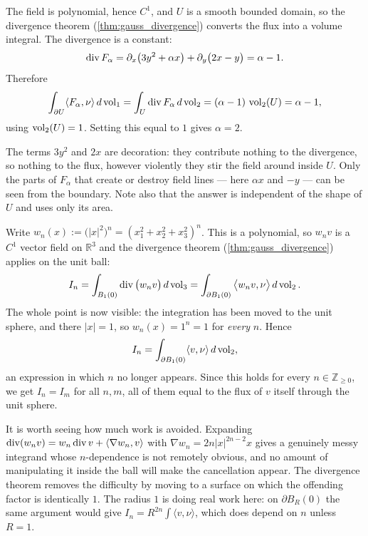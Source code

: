 \begin{exercisesolution}
\label{sol:tuning_alpha_prescribed_flux}
The field is polynomial, hence $C^1$, and $U$ is a smooth bounded domain, so the divergence theorem
(\cref{thm:gauss_divergence}) converts the flux into a volume integral. The divergence is a constant:
\[\operatorname{div} F_\alpha = \partial_x\big(3y^2 + \alpha x\big) + \partial_y\big(2x - y\big) = \alpha - 1 .\]
Therefore
\[\int_{\partial U} \langle F_\alpha, \nu\rangle \, d\operatorname{vol}_1 = \int_U \operatorname{div} F_\alpha \, d\operatorname{vol}_2
  = (\alpha - 1)\,\operatorname{vol}_2(U) = \alpha - 1,\]
using $\operatorname{vol}_2(U) = 1$. Setting this equal to $1$ gives $\boxed{\alpha = 2}$.
\begin{remark}
The terms $3y^2$ and $2x$ are decoration: they contribute nothing to the divergence, so nothing to
the flux, however violently they stir the field around inside $U$. Only the parts of $F_\alpha$ that
create or destroy field lines --- here $\alpha x$ and $-y$ --- can be seen from the boundary. Note
also that the answer is independent of the shape of $U$ and uses only its area.
\end{remark}
\end{exercisesolution}

\begin{exercisesolution}
\label{sol:radial_weight_flux_independent}
Write $w_n(x) := \big(\lvert x\rvert^2\big)^n = (x_1^2+x_2^2+x_3^2)^n$. This is a polynomial, so
$w_n v$ is a $C^1$ vector field on $\mathbb{R}^3$ and the divergence theorem
(\cref{thm:gauss_divergence}) applies on the unit ball:
\[I_n = \int_{B_1(0)} \operatorname{div}\big(w_n v\big) \, d\operatorname{vol}_3
      = \int_{\partial B_1(0)} \big\langle w_n v, \nu\big\rangle \, d\operatorname{vol}_2 .\]
The whole point is now visible: the integration has been moved to the unit sphere, and there
$\lvert x\rvert = 1$, so $w_n(x) = 1^n = 1$ for \emph{every} $n$. Hence
\[I_n = \int_{\partial B_1(0)} \langle v, \nu\rangle \, d\operatorname{vol}_2 ,\]
an expression in which $n$ no longer appears. Since this holds for every $n \in \mathbb{Z}_{\ge0}$,
we get $I_n = I_m$ for all $n, m$, all of them equal to the flux of $v$ itself through the unit
sphere.
\begin{ainote}
It is worth seeing how much work is avoided. Expanding $\operatorname{div}(w_n v) = w_n \operatorname{div} v + \langle \nabla
w_n, v\rangle$ with $\nabla w_n = 2n\lvert x\rvert^{2n-2}x$ gives a genuinely messy integrand whose
$n$-dependence is not remotely obvious, and no amount of manipulating it inside the ball will make
the cancellation appear. The divergence theorem removes the difficulty by moving to a surface on
which the offending factor is identically $1$. The radius $1$ is doing real work here: on
$\partial B_R(0)$ the same argument would give $I_n = R^{2n}\int\langle v,\nu\rangle$, which does
depend on $n$ unless $R = 1$.
\end{ainote}
\end{exercisesolution}


